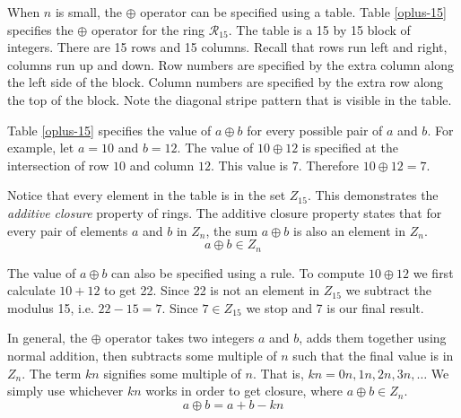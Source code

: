 
When $n$ is small, the $\oplus$ operator can be specified using a table.
Table \ref{oplus-15} specifies the $\oplus$ operator for the ring $\mathcal{R}_{15}$.
The table is a 15 by 15 block of integers.  There are 15 rows and 15 columns.
Recall that rows run left and right, columns run up and down.
Row numbers are specified by the extra column along the left side of the block.  
Column numbers are specified by the extra row along the top of the block.
Note the diagonal stripe pattern that is visible in the table.

\vspace{2ex}
\begin{table}[!ht]
  \begin{center}
    
    \caption{$a \oplus b \quad (\mathcal{R}_{15})$}
    \label{oplus-15}
  \end{center}
\end{table}

Table \ref{oplus-15} specifies the value of $a \oplus b$ for every possible pair of $a$ and $b$.
For example, let $a=10$ and $b=12$.
The value of $10 \oplus 12$ is specified at the intersection of row $10$ and column $12$.
This value is $7$.  Therefore $10 \oplus 12 = 7$.

Notice that every element in the table is in the set $Z_{15}$.
This demonstrates the \emph{additive closure} property of rings.
The additive closure property states that for every pair of elements $a$ and $b$ in $Z_n$,
the sum $a \oplus b$ is also an element in $Z_n$.
\[ a \oplus b \in Z_n \]

The value of $a \oplus b$ can also be specified using a rule.
To compute $10 \oplus 12$ we first calculate $10 + 12$ to get 22.
Since 22 is not an element in $Z_{15}$ we subtract the modulus 15, i.e. $22 - 15 = 7$.
Since $7 \in Z_{15}$ we stop and 7 is our final result.

In general, the $\oplus$ operator takes two integers $a$ and $b$, 
adds them together using normal addition, 
then subtracts some multiple of $n$ such that the final value is in $Z_n$.
The term $kn$ signifies some multiple of $n$. That is, $kn=0n,1n,2n,3n,\ldots$
We simply use whichever $kn$ works in order to get closure, where $a \oplus b \in Z_n$.
\[  a \oplus b = a + b - kn  \]

